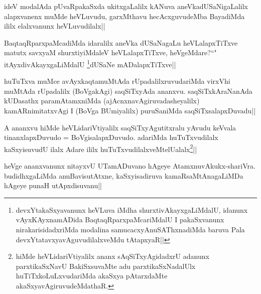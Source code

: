 \begin{artha}
ideV modalAda pUvaRpakaSxda ukitxgaLalilx kANuva aneVkadUSaNigaLalilx alapxvanenx muMde heVLuvudu, garxMthavu hecAcxguvudeMba BayadiMda ililx elalxvanunx heVLuvudilalx||
\end{artha}


\begin{artha}
BaqtaqRparxpaMcadiMda idaralilx aneVka dUSaNagaLu heVLalapxTiTxve matutx savxyaM 
shurxtiyiMdaleV heVLalapxTiTxve, heVgeMdare?``\stext" itAyxdivAkayxgaLiMdalU
\footnote{devxYtakaSxyavanunx heVLuva iMdha shurxtivAkayxgaLiMdalU, idanunx vAyxKAyxnamADida BaqtaqRparxpaMcariMdalU I pakaSxvanunx nirakarisidadxriMda modalina samucacxyAnuSAThxnadiMda baruva Pala  devxYtatavxyavAguvudilalxveMdu tAtapxyaR||}dUSaNe 
mADalapxTiTxve||
\end{artha}


\begin{artha}
huTuTxva muMce avAyxkaqtamuMtAda rUpadalilxruvudariMda virxVhi muMtAda rUpadalilx (BoVgakAgi) saqSiTxyAda ananxvu. saqSiTxkAraNanAda kUDasathx paramAtamxniMda (ajAcnxnavAgiruvadasheyalilx) kamARnimitatxvAgi I (BoVga BUmiyalilx) puruSaniMda saqSiTxsalapxDuvadu||
\end{artha}


\begin{artha}
A ananxvu hiMde heVLidariVtiyalilx saqSiTxyAgutitxralu yAvudu keVvala tinanxlapxDuvudo = BoVgisalapxDuvudo. adariMda huTuTxvudilalx kaSxyisuvudU ilalx Adare ililx huTuTxvudilalxveMtelUalalx\footnote{hiMde heVLidariVtiyalilx ananx sAqSiTxyAgidadxrU adanunx parxtikaSxNavU BakiSxsuvaMte adu parxtikaSxNadalUlx huTiTxkoLuLxvudariMda akaSxya pAtarxdaMte akaSxyavAgiruvudeMdathaR.}||
\end{artha}


\begin{artha}
heVge ananxvanunx nitayxvU UTamADuvano hAgeye AtamxnuvAkukx-shariVra. budidhxgaLiMda 
anuBavisutAtxne, kaSxyisadiruva kamaRsaMtAnagaLiMDa hAgeye punaH utApxdisuvanu||
\end{artha}


